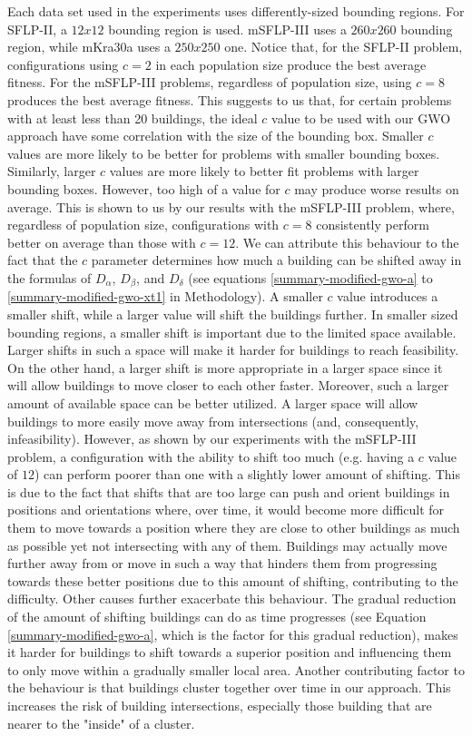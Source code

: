 Each data set used in the experiments uses differently-sized bounding regions. For SFLP-II, a $12x12$ bounding region is used. mSFLP-III uses a $260x260$ bounding region, while mKra30a uses a $250x250$ one. Notice that, for the SFLP-II problem, configurations using $c = 2$ in each population size produce the best average fitness. For the mSFLP-III problems, regardless of population size, using $c = 8$ produces the best average fitness. This suggests to us that, for certain problems with at least less than 20 buildings, the ideal $c$ value to be used with our GWO approach have some correlation with the size of the bounding box. Smaller $c$ values are more likely to be better for problems with smaller bounding boxes. Similarly, larger $c$ values are more likely to better fit problems with larger bounding boxes. However, too high of a value for $c$ may produce worse results on average. This is shown to us by our results with the mSFLP-III problem, where, regardless of population size, configurations with $c = 8$ consistently perform better on average than those with $c = 12$. We can attribute this behaviour to the fact that the $c$ parameter determines how much a building can be shifted away in the formulas of $D_{\alpha}$, $D_{\beta}$, and $D_{\delta}$ (see equations \ref{summary-modified-gwo-a} to \ref{summary-modified-gwo-xt1} in Methodology). A smaller $c$ value introduces a smaller shift, while a larger value will shift the buildings further. In smaller sized bounding regions, a smaller shift is important due to the limited space available. Larger shifts in such a space will make it harder for buildings to reach feasibility. On the other hand, a larger shift is more appropriate in a larger space since it will allow buildings to move closer to each other faster. Moreover, such a larger amount of available space can be better utilized. A larger space will allow buildings to more easily move away from intersections (and, consequently, infeasibility). However, as shown by our experiments with the mSFLP-III problem, a configuration with the ability to shift too much (e.g. having a $c$ value of $12$) can perform poorer than one with a slightly lower amount of shifting. This is due to the fact that shifts that are too large can push and orient buildings in positions and orientations where, over time, it would become more difficult for them to move towards a position where they are close to other buildings as much as possible yet not intersecting with any of them. Buildings may actually move further away from or move in such a way that hinders them from progressing towards these better positions due to this amount of shifting, contributing to the difficulty. Other causes further exacerbate this behaviour. The gradual reduction of the amount of shifting buildings can do as time progresses (see Equation \ref{summary-modified-gwo-a}, which is the factor for this gradual reduction), makes it harder for buildings to shift towards a superior position and influencing them to only move within a gradually smaller local area. Another contributing factor to the behaviour is that buildings cluster together over time in our approach. This increases the risk of building intersections, especially those building that are nearer to the "inside" of a cluster.

